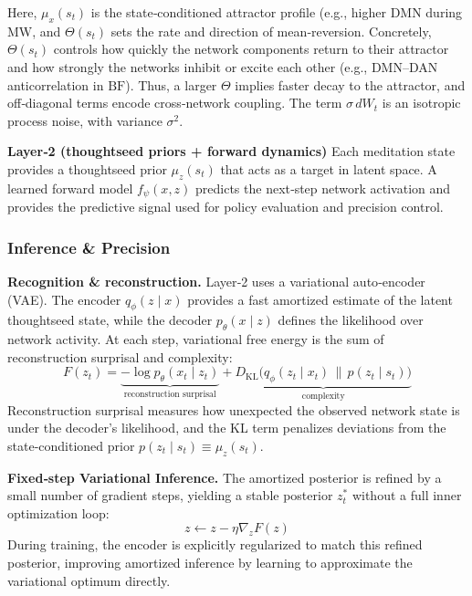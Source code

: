 \documentclass[openacc]{rsproca_new}%
\begin{document}
Here, \( \mu_x(s_t) \) is the state‑conditioned attractor profile (e.g., higher DMN during \(\mathrm{MW}\), and \( \Theta(s_t) \) sets the rate and direction of mean‑reversion. Concretely, \( \Theta(s_t) \) controls how quickly the network components return to their attractor and how strongly the networks inhibit or excite each other (e.g., DMN–DAN anticorrelation in \(\mathrm{BF}\)). Thus, a larger \( \Theta \) implies faster decay to the attractor, and off‑diagonal terms encode cross‑network coupling. The term \( \sigma\, dW_t \) is an isotropic process noise, with variance \(\sigma^2\).

\textbf{Layer‑2 (thoughtseed priors + forward dynamics)} 
Each meditation state provides a thoughtseed prior \( \mu_z(s_t) \) that acts as a target in latent space. A learned forward model \( f_\psi(x,z) \) predicts the next‑step network activation and provides the predictive signal used for policy evaluation and precision control.

\subsubsection{Inference \& Precision}

\textbf{Recognition \& reconstruction.} Layer‑2 uses a variational auto‑encoder (VAE). The encoder \(q_\phi(z \mid x)\) provides a fast amortized estimate of the latent thoughtseed state, while the decoder \(p_\theta(x \mid z)\) defines the likelihood over network activity. At each step, variational free energy is the sum of reconstruction surprisal and complexity:
\begin{equation}
F(z_t) = \underbrace{-\log p_\theta(x_t \mid z_t)}_{\text{reconstruction surprisal}}
+ \underbrace{D_{\mathrm{KL}}\big(q_\phi(z_t \mid x_t) \,\|\, p(z_t \mid s_t)\big)}_{\text{complexity}}
\tag{2}
\end{equation}
Reconstruction surprisal measures how unexpected the observed network state is under the decoder’s likelihood, and the KL term penalizes deviations from the state‑conditioned prior \(p(z_t \mid s_t)\equiv\mu_z(s_t)\).

\textbf{Fixed‑step Variational Inference.} The amortized posterior is refined by a small number of gradient steps, yielding a stable posterior \(z_t^*\) without a full inner optimization loop:
\begin{equation}
z \leftarrow z - \eta \nabla_z F(z) \tag{3}
\end{equation}
During training, the encoder is explicitly regularized to match this refined posterior, improving amortized inference by learning to approximate the variational optimum directly.
\end{document}
